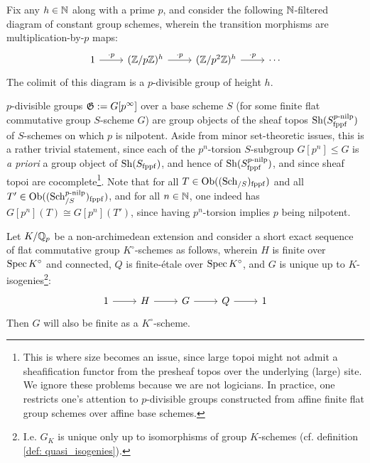            \begin{example}
                Fix any $h \in \mathbb{N}$ along with a prime $p$, and consider the following $\mathbb{N}$-filtered diagram of constant group schemes, wherein the transition morphisms are multiplication-by-$p$ maps:
                    $$
                        \begin{tikzcd}
                        	1 & {(\Z/p\Z)^h} & {(\Z/p^2\Z)^h} & \cdots
                        	\arrow["{\cdot p}", from=1-2, to=1-3]
                        	\arrow["{\cdot p}", from=1-3, to=1-4]
                        	\arrow["{\cdot p}", from=1-1, to=1-2]
                        \end{tikzcd}
                    $$
                The colimit of this diagram is a $p$-divisible group of height $h$.
            \end{example}
            \begin{remark}
                $p$-divisible groups $\mathfrak{G} := G[p^{\infty}]$ over a base scheme $S$ (for some finite flat commutative group $S$-scheme $G$) are group objects of the sheaf topos $\mathrm{Sh}(S_{\mathrm{fppf}}^{p\text{-}\mathrm{nilp}})$ of $S$-schemes on which $p$ is nilpotent. Aside from minor set-theoretic issues, this is a rather trivial statement, since each of the $p^n$-torsion $S$-subgroup $G[p^n] \leq G$ is \textit{a priori} a group object of $\mathrm{Sh}(S_{\mathrm{fppf}})$, and hence of $\mathrm{Sh}(S_{\mathrm{fppf}}^{p\text{-}\mathrm{nilp}})$, and since sheaf topoi are cocomplete\footnote{This is where size becomes an issue, since large topoi might not admit a sheafification functor from the presheaf topos over the underlying (large) site. We ignore these problems because we are not logicians. In practice, one restricts one's attention to $p$-divisible groups constructed from affine finite flat group schemes over affine base schemes.}. Note that for all $T \in \mathrm{Ob}((\mathrm{Sch}_{/S})_{\mathrm{fppf}})$ and all $T' \in \mathrm{Ob}((\mathrm{Sch}_{/S}^{p\text{-}\mathrm{nilp}})_{\mathrm{fppf}})$, and for all $n \in \mathbb{N}$, one indeed has $G[p^n](T) \cong G[p^n](T')$, since having $p^n$-torsion implies $p$ being nilpotent.
            \end{remark}
            \begin{lemma} \label{lemma: extensions_of_etale_finite_flat_commutative_groups_by_connected_finite_flat_groups}
                Let $K/\mathbb{Q}_p$ be a non-archimedean extension and consider a short exact sequence of flat commutative group $K^{\circ}$-schemes as follows, wherein $H$ is finite over $\operatorname{Spec} K^{\circ}$ and connected, $Q$ is finite-\'etale over $\operatorname{Spec} K^{\circ}$, and $G$ is unique up to $K$-isogenies\footnote{I.e. $G_K$ is unique only up to isomorphisms of group $K$-schemes (cf. definition \ref{def: quasi_isogenies}).}:
                    $$
                        \begin{tikzcd}
                        	1 & H & G & Q & 1
                        	\arrow[from=1-1, to=1-2]
                        	\arrow[from=1-2, to=1-3]
                        	\arrow[from=1-3, to=1-4]
                        	\arrow[from=1-4, to=1-5]
                        \end{tikzcd}
                    $$
                Then $G$ will also be finite as a $K^{\circ}$-scheme.
            \end{lemma}
